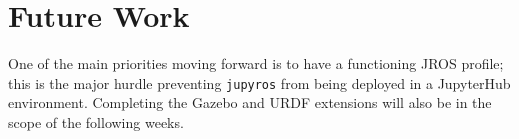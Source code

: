\section{Future Work}

    One of the main priorities moving forward is to have a functioning JROS profile; this is the major hurdle preventing \texttt{jupyros} from being deployed in a JupyterHub environment. Completing the Gazebo and URDF extensions will also be in the scope of the following weeks.
